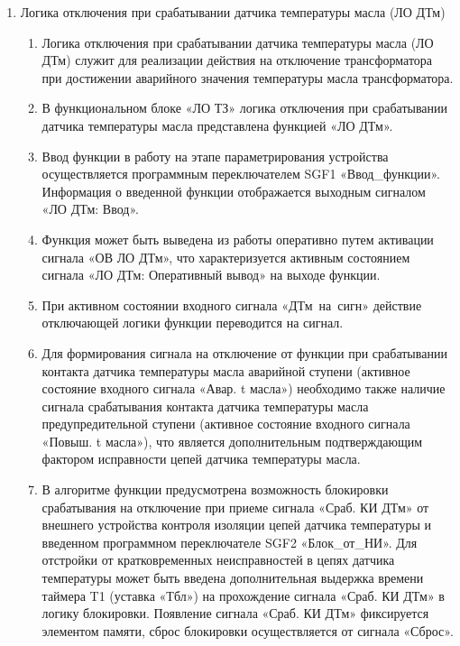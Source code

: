 \begin{enumerate}
\item Логика отключения при срабатывании датчика температуры масла (ЛО ДТм)

\begin{enumerate}

\item
Логика отключения при срабатывании датчика температуры масла (ЛО ДТм) служит для реализации действия на отключение трансформатора при достижении аварийного значения температуры масла трансформатора.

\item
В функциональном блоке «ЛО ТЗ» логика отключения при срабатывании датчика температуры масла представлена функцией «ЛО ДТм».

\item
Ввод функции в работу на этапе параметрирования устройства осуществляется программным переключателем SGF1 «Ввод\_функции». Информация о введенной функции отображается выходным сигналом «ЛО ДТм: Ввод».
\item
Функция может быть выведена из работы оперативно путем активации сигнала «ОВ ЛО ДТм», что характеризуется активным состоянием сигнала «ЛО ДТм: Оперативный вывод» на выходе функции. 
\item
При активном состоянии входного сигнала «ДТм~на~сигн» действие отключающей логики функции переводится на сигнал.
\item
Для формирования сигнала на отключение от функции при срабатывании контакта датчика температуры масла аварийной ступени (активное состояние входного сигнала «Авар. t масла») необходимо также наличие сигнала срабатывания контакта датчика температуры масла предупредительной ступени (активное состояние входного сигнала «Повыш. t масла»), что является дополнительным подтверждающим фактором исправности цепей датчика температуры масла.

\item
В алгоритме функции предусмотрена возможность блокировки срабатывания на отключение при приеме сигнала «Сраб. КИ ДТм» от внешнего устройства контроля изоляции цепей датчика температуры и введенном программном переключателе SGF2 «Блок\_от\_НИ». Для отстройки от кратковременных неисправностей в цепях датчика температуры может быть введена дополнительная выдержка времени таймера T1 (уставка «Тбл») на прохождение сигнала «Сраб. КИ ДТм» в логику блокировки. Появление сигнала «Сраб. КИ ДТм» фиксируется элементом памяти, сброс блокировки осуществляется от сигнала «Сброс».


\end{enumerate}
\end{enumerate}
